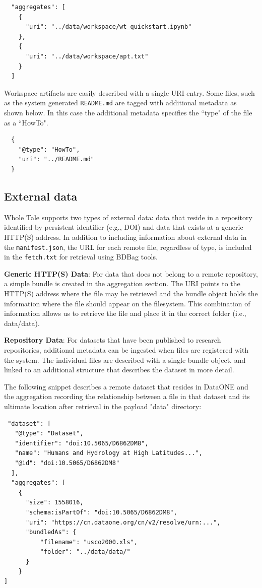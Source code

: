 \documentclass[conference]{IEEEtran}
\begin{document}
\begin{lstlisting}
  "aggregates": [
    {
      "uri": "../data/workspace/wt_quickstart.ipynb"
    },
    {
      "uri": "../data/workspace/apt.txt"
    }
  ]
\end{lstlisting}

Workspace artifacts are easily described with a single URI entry. Some files, such as the 
system generated \texttt{README.md} are tagged with additional metadata as shown below. In this case the 
additional metadata specifies the ``type" of the file as a ``HowTo".

\begin{lstlisting}
  {
    "@type": "HowTo",
    "uri": "../README.md"
  }
\end{lstlisting}

\subsection{External data}

Whole Tale supports two types of external data: data that reside in a repository identified by persistent identifier (e.g., DOI) and data that exists at a generic HTTP(S) address. In addition to 
including information about external data in the \texttt{manifest.json}, the URL for each remote file, regardless of type, is included in the \texttt{fetch.txt} for retrieval using BDBag tools.

{\bf Generic HTTP(S) Data}:
For data that does not belong to a remote repository, a simple bundle is created in the aggregation section. The URI points to the HTTP(S) address where the file may be retrieved and the bundle object holds the information where the file should appear on the filesystem. This combination of information allows us to retrieve the file and place it in the correct folder (i.e., data/data).

{\bf Repository Data}: 
For datasets that have been published to research repositories, additional metadata can be ingested when files are registered with the system. The individual files are described with a single bundle object, and linked to an additional structure that describes the dataset in more detail.

The following snippet describes a remote dataset that resides in DataONE and the aggregation recording the relationship between a file in that dataset and its ultimate location after 
retrieval in the payload "data" directory:


\begin{lstlisting}
 "dataset": [
   "@type": "Dataset",
   "identifier": "doi:10.5065/D6862DM8",
   "name": "Humans and Hydrology at High Latitudes...",
   "@id": "doi:10.5065/D6862DM8"
  ],
  "aggregates": [
    {
      "size": 1558016,
      "schema:isPartOf": "doi:10.5065/D6862DM8",
      "uri": "https://cn.dataone.org/cn/v2/resolve/urn:...",
      "bundledAs": {
          "filename": "usco2000.xls",
          "folder": "../data/data/"
      }
    }
]
\end{lstlisting}
\end{document}
